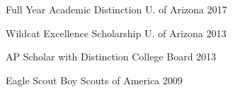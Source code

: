 \vspace{-0.75cm}

\begin{multicols}{2}
\begin{cvhonors}
  \cvhonor
    {Full Year Academic Distinction} %
    {U. of Arizona} %
    {} %
    {2017} %

  \cvhonor
    {Wildcat Excellence Scholarship} %
    {U. of Arizona} %
    {} %
    {2013} %
\end{cvhonors}

\begin{cvhonors}
  \cvhonor
    {AP Scholar with Distinction} %
    {College Board} %
    {} %
    {2013} %

  \cvhonor
    {Eagle Scout} %
    {Boy Scouts of America} %
    {} %
    {2009} %
\end{cvhonors}
\end{multicols}
